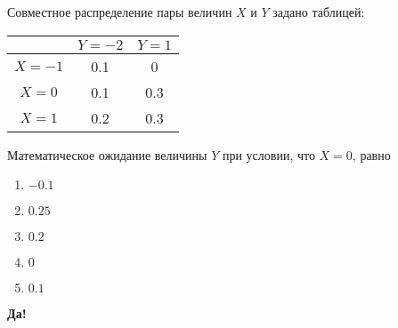 \documentclass[t]{beamer}
\begin{document}
 \begin{frame} \label{14-Yes} 
\begin{block}{14} 

Совместное распределение пары величин $X$ и $Y$ задано таблицей:

\begin{center}
\begin{tabular}{c|cc}
 & $Y=-2$ & $Y=1$ \\
\hline
$X=-1$ & 0.1 & 0 \\
$X=0$ & 0.1 & 0.3 \\
$X=1$ & 0.2 & 0.3 \\
\end{tabular}
\end{center}
\vspace{0.2cm} 
 
 Математическое ожидание величины $Y$ при условии, что $X=0$, равно
 


 \end{block} 
\begin{enumerate} 
\item[] \hyperlink{14-No}{\beamergotobutton{} $-0.1$}
\item[] \hyperlink{14-Yes}{\beamergotobutton{} $0.25$}
\item[] \hyperlink{14-No}{\beamergotobutton{} $0.2$}
\item[] \hyperlink{14-No}{\beamergotobutton{} $0$}
\item[] \hyperlink{14-No}{\beamergotobutton{} $0.1$}
\end{enumerate} 

 \textbf{Да!} 
 \hyperlink{15}{}\end{frame} 
\end{document}
